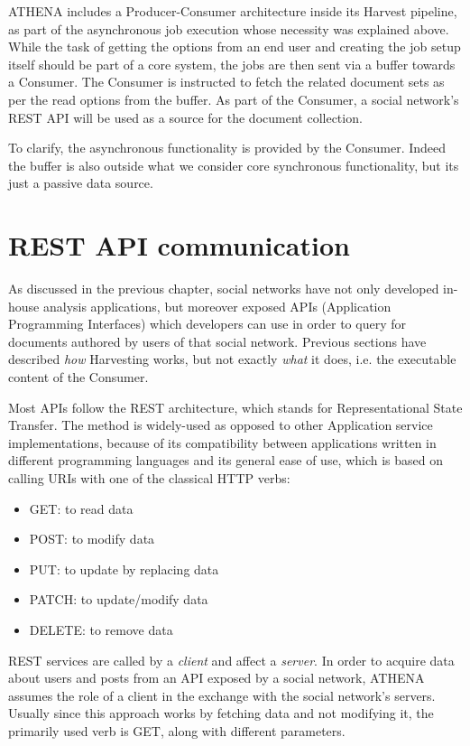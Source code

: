 \documentclass[12pt,a4paper,twoside]{report}
\begin{document}
ATHENA includes a Producer-Consumer architecture inside its Harvest pipeline, as part of the asynchronous job execution whose necessity was explained above. While the task of getting the options from an end user and creating the job setup itself should be part of a core system, the jobs are then sent via a buffer towards a Consumer. The Consumer is instructed to fetch the related document sets as per the read options from the buffer. As part of the Consumer, a social network's REST API will be used as a source for the document collection.

To clarify, the asynchronous functionality is provided by the Consumer. Indeed the buffer is also outside what we consider core synchronous functionality, but its just a passive data source.

\section{REST API communication}
As discussed in the previous chapter, social networks have not only developed in-house analysis applications, but moreover exposed APIs (Application Programming Interfaces) which developers can use in order to query for documents authored by users of that social network. Previous sections have described \emph{how} Harvesting works, but not exactly \emph{what} it does, i.e. the executable content of the Consumer.

Most APIs follow the REST architecture, which stands for Representational State Transfer. The method is widely-used as opposed to other Application service implementations, because of its compatibility between applications written in different programming languages and its general ease of use, which is based on calling URIs with one of the classical HTTP verbs:

\begin{itemize}
\item GET: to read data
\item POST: to modify data
\item PUT: to update by replacing data
\item PATCH: to update/modify data
\item DELETE: to remove data
\end{itemize}

REST services are called by a \emph{client} and affect a \emph{server}. In order to acquire data about users and posts from an API exposed by a social network, ATHENA assumes the role of a client in the exchange with the social network's servers. Usually since this approach works by fetching data and not modifying it, the primarily used verb is GET, along with different parameters.
\end{document}
